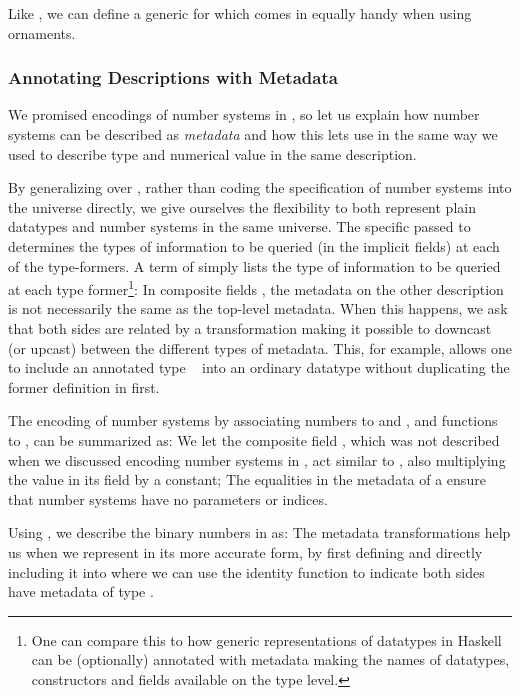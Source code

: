 Like , we can define a generic  for 
which comes in equally handy when using ornaments.

\subsubsection{Annotating Descriptions with Metadata}
We promised encodings of number systems in , so let us explain how number systems can be described as \emph{metadata} and how this lets use  in the same way we used  to describe type and numerical value in the same description.

By generalizing  over , rather than coding the specification of number systems into the universe directly, we give ourselves the flexibility to both represent plain datatypes and number systems in the same universe. The specific  passed to  determines the types of information to be queried (in the implicit  fields) at each of the type-formers. A term of  simply lists the type of information to be queried at each type former\footnote{One can compare this to how generic representations of datatypes in Haskell can be (optionally) annotated with metadata making the names of datatypes, constructors and fields available on the type level.}:
In composite fields , the metadata on the other description is not necessarily the same as the top-level metadata. When this happens, we ask that both sides are related by a transformation
making it possible to downcast (or upcast) between the different types of metadata. This, for example, allows one to include an annotated type \  into an ordinary datatype  without duplicating the former definition in  first.

The encoding of number systems by associating numbers to  and , and functions to , can be summarized as:
We let the composite field , which was not described when we discussed encoding number systems in , act similar to , also multiplying the value in its field by a constant; The equalities in the metadata of a  ensure that number systems have no parameters or indices. 

Using , we describe the binary numbers  in  as:
The metadata transformations help us when we represent  in its more accurate form, by first defining 
and directly including it into 
where we can use the identity function to indicate both sides have metadata of type .

